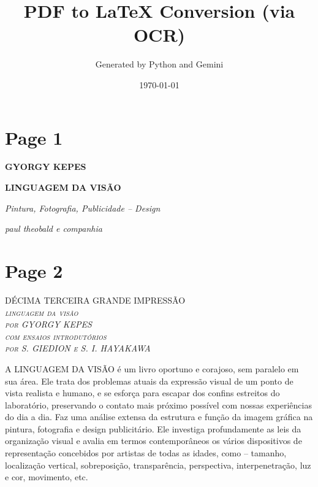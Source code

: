 \documentclass[a4paper]{article}
\title{PDF to LaTeX Conversion (via OCR)}
\author{Generated by Python and Gemini}
\date{\today}
\begin{document}
\maketitle

\newpage
\section*{Page 1}

\textbf{GYORGY KEPES}\par

\vspace*{2cm}

\Huge\textbf{LINGUAGEM DA VISÃO}\par

\vspace*{0.5cm}

\textit{Pintura, Fotografia, Publicidade -- Design}\par

\vfill

\hfill \textit{paul theobald e companhia}\par

\newpage
\section*{Page 2}

{\centering
\scshape DÉCIMA TERCEIRA GRANDE IMPRESSÃO \\[1em]
\itshape linguagem da visão \\[1em]
\scshape por GYORGY KEPES \\[1em]
\itshape com ensaios introdutórios \\[1em]
\scshape por S. GIEDION e S. I. HAYAKAWA
\par
}

\bigskip

A {\scshape LINGUAGEM DA VISÃO} é um livro oportuno e corajoso, sem paralelo em sua área. Ele trata dos problemas atuais da expressão visual de um ponto de vista realista e humano, e se esforça para escapar dos confins estreitos do laboratório, preservando o contato mais próximo possível com nossas experiências do dia a dia. Faz uma análise extensa da estrutura e função da imagem gráfica na pintura, fotografia e design publicitário. Ele investiga profundamente as leis da organização visual e avalia em termos contemporâneos os vários dispositivos de representação concebidos por artistas de todas as idades, como -- tamanho, localização vertical, sobreposição, transparência, perspectiva, interpenetração, luz e cor, movimento, etc.
\end{document}
